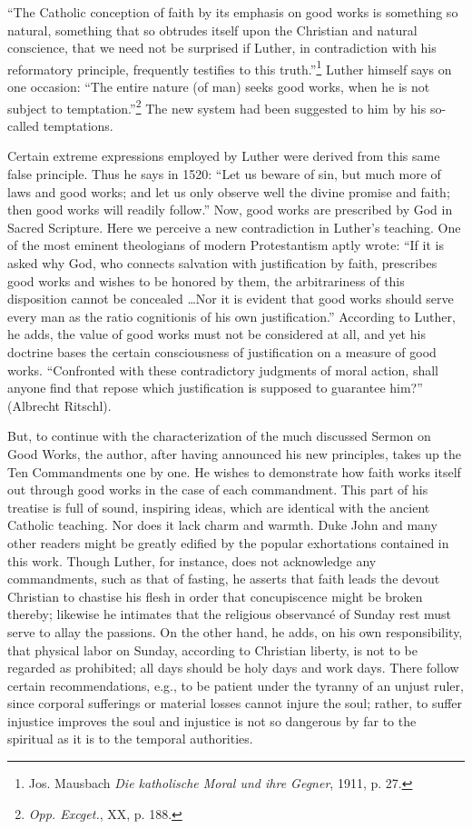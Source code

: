 “The Catholic conception of faith by its emphasis on good works is something
so natural, something that so obtrudes itself upon the Christian and
natural conscience, that we need not be surprised if Luther, in contradiction
with his reformatory principle, frequently testifies to this truth.”\footnote
{Jos. Mausbach \textit{Die katholische Moral und ihre Gegner}, 1911, p. 27.}
Luther himself says on one occasion: “The entire nature (of man) seeks
good works, when he is not subject to temptation.”\footnote{\textit{Opp. Excget.}, XX, p. 188.}
The new system had been suggested to him by his so-called temptations.

Certain extreme expressions employed by Luther were derived from this
same false principle. Thus he says in 1520: “Let us beware of sin,
but much more of laws and good works; and let us only observe well the
divine promise and faith; then good works will readily follow.” Now,
good works are prescribed by God in Sacred Scripture. Here we perceive
a new contradiction in Luther’s teaching. One of the most eminent theologians
of modern Protestantism aptly wrote: “If it is asked why God, who
connects salvation with justification by faith, prescribes good works and
wishes to be honored by them, the arbitrariness of this disposition cannot be
concealed \dots Nor it is evident that good works should serve every man
as the ratio cognitionis of his own justification.” According to Luther, he
adds, the value of good works must not be considered at all, and yet his
doctrine bases the certain consciousness of justification on a measure of good
works. “Confronted with these contradictory judgments of moral action,
shall anyone find that repose which justification is supposed to guarantee
him?” (Albrecht Ritschl).

But, to continue with the characterization of the much discussed
Sermon on Good Works, the author, after having announced his new
principles, takes up the Ten Commandments one by one. He wishes
to demonstrate how faith works itself out through good works in
the case of each commandment. This part of his treatise is full of sound,
inspiring ideas, which are identical with the ancient Catholic teaching.
Nor does it lack charm and warmth. Duke John and many other
readers might be greatly edified by the popular exhortations contained
in this work. Though Luther, for instance, does not acknowledge
any commandments, such as that of fasting, he asserts that
faith leads the devout Christian to chastise his flesh in order that concupiscence
might be broken thereby; likewise he intimates that the
religious observancé of Sunday rest must serve to allay the passions.
On the other hand, he adds, on his own responsibility, that physical
labor on Sunday, according to Christian liberty, is not
to be regarded as prohibited; all days should be holy days and work days.
There follow certain recommendations, e.g., to be patient under the
tyranny of an unjust ruler, since corporal sufferings or material losses
cannot injure the soul; rather, to suffer injustice improves the soul
and injustice is not so dangerous by far to the spiritual as it is to the
temporal authorities.

